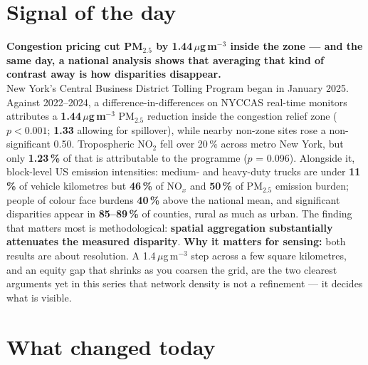\documentclass[10pt]{article}
\begin{document}
\vspace{6mm}

\section*{\sffamily\bfseries\color{Deep}Signal of the day}
\vspace{-1.5mm}{\color{Amber}\rule{\linewidth}{1.1pt}}\vspace{2.5mm}

\begin{keybox}
{\sffamily\bfseries\small\color{Deep}Congestion pricing cut PM$_{2.5}$ by
1.44\,$\mu$g\,m$^{-3}$ inside the zone --- and the same day, a national analysis shows that averaging
that kind of contrast away is how disparities disappear.}\\[1.4mm]
\footnotesize
New York's Central Business District Tolling Program began in January 2025. Against 2022--2024, a
difference-in-differences on NYCCAS real-time monitors attributes a \textbf{1.44\,$\mu$g\,m$^{-3}$}
PM$_{2.5}$ reduction inside the congestion relief zone ($p<0.001$; \textbf{1.33} allowing for spillover),
while nearby non-zone sites rose a non-significant 0.50. Tropospheric NO$_2$ fell over 20\,\% across metro
New York, but only \textbf{1.23\,\%} of that is attributable to the programme ($p$ = 0.096).
Alongside it, block-level US emission intensities: medium- and heavy-duty trucks are under \textbf{11\,\%}
of vehicle kilometres but \textbf{46\,\%} of NO$_x$ and \textbf{50\,\%} of PM$_{2.5}$ emission burden;
people of colour face burdens \textbf{40\,\%} above the national mean, and significant disparities appear
in \textbf{85--89\,\%} of counties, rural as much as urban. The finding that matters most is methodological:
\textbf{spatial aggregation substantially attenuates the measured disparity}.
\textbf{Why it matters for sensing:} both results are about resolution. A 1.4\,$\mu$g\,m$^{-3}$ step across
a few square kilometres, and an equity gap that shrinks as you coarsen the grid, are the two clearest
arguments yet in this series that network density is not a refinement --- it decides what is visible.\par
\end{keybox}

\vspace{3mm}

\section*{\sffamily\bfseries\color{Deep}What changed today}
\vspace{-1.5mm}{\color{Amber}\rule{\linewidth}{1.1pt}}\vspace{2.5mm}
\end{document}
